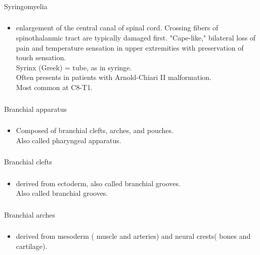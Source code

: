 \documentclass[11pt]{beamer}
\begin{document}
\begin{frame}
 \frametitle{}
Syringomyelia
\end{frame}

\begin{frame}
 \frametitle{}
\begin{itemize}
\item{enlargement of the central canal of spinal cord. Crossing fibers of spinothalanmic tract are typically damaged first. "Cape-like," bilateral loss of pain and temperature sensation in upper extremities with preservation of touch sensation. \\ Syrinx (Greek) = tube, as in syringe. \\ Often presents in patients with Arnold-Chiari II malformation. \\ Most common at C8-T1.}
\end{itemize}
\end{frame}

\begin{frame}
 \frametitle{}
Branchial apparatus
\end{frame}

\begin{frame}
 \frametitle{}
\begin{itemize}
\item{Composed of branchial clefts, arches, and pouches. \\  Also called pharyngeal apparatus.}
\end{itemize}
\end{frame}

\begin{frame}
 \frametitle{}
Branchial clefts
\end{frame}

\begin{frame}
 \frametitle{}
\begin{itemize}
\item{derived from ectoderm, also called branchial grooves.  \\ Also called branchial grooves.}
\end{itemize}
\end{frame}

\begin{frame}
 \frametitle{}
Branchial arches
\end{frame}

\begin{frame}
 \frametitle{}
\begin{itemize}
\item{derived from mesoderm ( muscle and arteries) and neural crests( bones and cartilage). }
\end{itemize}
\end{frame}
\end{document}
